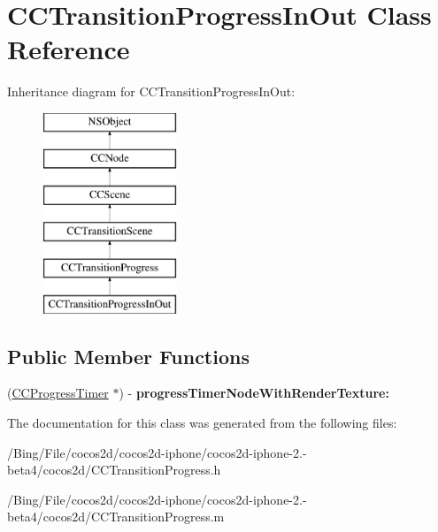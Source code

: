 \hypertarget{interface_c_c_transition_progress_in_out}{\section{C\-C\-Transition\-Progress\-In\-Out Class Reference}
\label{interface_c_c_transition_progress_in_out}
}
Inheritance diagram for C\-C\-Transition\-Progress\-In\-Out\-:\begin{figure}[H]
\begin{center}
\leavevmode
\includegraphics[height=6.000000cm]{interface_c_c_transition_progress_in_out}
\end{center}
\end{figure}
\subsection*{Public Member Functions}
\begin{DoxyCompactItemize}
\item 
\hypertarget{interface_c_c_transition_progress_in_out_a9aa0ee6ed587a891a0ee947fb8d72378}{(\hyperlink{interface_c_c_progress_timer}{C\-C\-Progress\-Timer} $\ast$) -\/ {\bfseries progress\-Timer\-Node\-With\-Render\-Texture\-:}}\label{interface_c_c_transition_progress_in_out_a9aa0ee6ed587a891a0ee947fb8d72378}

\end{DoxyCompactItemize}


The documentation for this class was generated from the following files\-:\begin{DoxyCompactItemize}
\item 
/\-Bing/\-File/cocos2d/cocos2d-\/iphone/cocos2d-\/iphone-\/2.-\/beta4/cocos2d/C\-C\-Transition\-Progress.\-h\item 
/\-Bing/\-File/cocos2d/cocos2d-\/iphone/cocos2d-\/iphone-\/2.-\/beta4/cocos2d/C\-C\-Transition\-Progress.\-m\end{DoxyCompactItemize}
